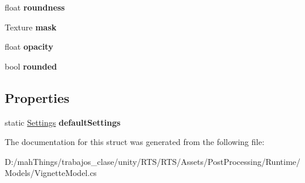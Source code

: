 \begin{DoxyCompactItemize}
float {\bfseries roundness}
\item 
\mbox{\label{struct_unity_engine_1_1_post_processing_1_1_vignette_model_1_1_settings_a7d929d4c446d91c488ced7f5fbbcc692}} 
Texture {\bfseries mask}
\item 
\mbox{\label{struct_unity_engine_1_1_post_processing_1_1_vignette_model_1_1_settings_a12f126ffbe9e86dce6a11d5f8313ace6}} 
float {\bfseries opacity}
\item 
\mbox{\label{struct_unity_engine_1_1_post_processing_1_1_vignette_model_1_1_settings_ac84a3387d5ffb33aea9fe2b7639ae402}} 
bool {\bfseries rounded}
\end{DoxyCompactItemize}
\subsection*{Properties}
\begin{DoxyCompactItemize}
\item 
\mbox{\label{struct_unity_engine_1_1_post_processing_1_1_vignette_model_1_1_settings_a7c1f4d2623dc2a4679a59de4c1d8ab11}} 
static \mbox{\hyperlink{struct_unity_engine_1_1_post_processing_1_1_vignette_model_1_1_settings}{Settings}} {\bfseries default\+Settings}
\end{DoxyCompactItemize}


The documentation for this struct was generated from the following file\+:\begin{DoxyCompactItemize}
\item 
D\+:/mah\+Things/trabajos\+\_\+clase/unity/\+R\+T\+S/\+R\+T\+S/\+Assets/\+Post\+Processing/\+Runtime/\+Models/Vignette\+Model.\+cs\end{DoxyCompactItemize}
